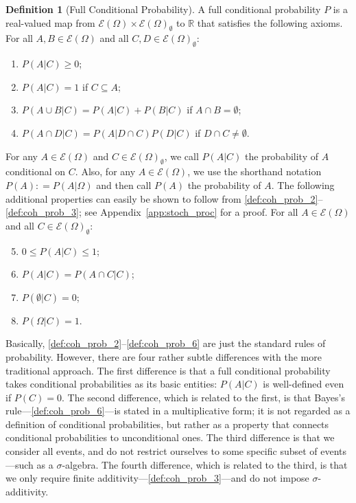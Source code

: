\documentclass[10pt,a4paper]{paper}
\theoremstyle{definition}
\newtheorem{definition}{Definition}
\newcommand{\reals}{\mathbb{R}}
\newcommand{\paths}{\Omega}
\newcommand{\power}{\mathcal{E}(\paths)}
\newcommand{\nonemptypower}{\power_{\emptyset}}
\newcommand{\coloneqq}{:\!=}
\begin{document}
\begin{definition}[Full Conditional Probability]\label{def:cond_prob}
A full conditional probability $P$ is a real-valued map from $\power\times\nonemptypower$ to $\reals$ that satisfies the following axioms. For all $A,B\in\power$ and all \mbox{$C,D\in\nonemptypower$}:
\vspace{5pt}

\begin{enumerate}[label=F\arabic*:,ref=F\arabic*]
\item
$P(A\vert C)\geq 0$;\label{def:coh_prob_2}
\item
$P(A\vert C)=1$ if $C\subseteq A$;\label{def:coh_prob_1}
\item
$P(A\cup B\vert C)=P(A\vert C)+P(B\vert C)$ if $A\cap B=\emptyset$;\label{def:coh_prob_3}
\item
$P(A\cap D\vert C)=P(A\vert D\cap C)P(D\vert C)$ if $D\cap C\neq\emptyset$.\label{def:coh_prob_6}
\end{enumerate}
\vspace{5pt}

\noindent
For any $A\in\power$ and $C\in\nonemptypower$, we call $P(A\vert C)$ the probability of $A$ conditional on $C$. Also, for any $A\in\power$, we use the shorthand notation $P(A)\coloneqq P(A\vert\paths)$ and then call $P(A)$ the probability of $A$.
The following additional properties can easily be shown to follow from \ref{def:coh_prob_2}--\ref{def:coh_prob_3}; see Appendix~\ref{app:stoch_proc} for a proof. For all $A\in\power$ and all $C\in\nonemptypower$:
\vspace{5pt}
\begin{enumerate}[label=F\arabic*:,ref=F\arabic*]
\setcounter{enumi}{4}
\item
$0\leq P(A\vert C)\leq 1$;\label{def:coh_prob_2b}
\item
$P(A\vert C)=P(A\cap C\vert C)$;\label{def:coh_prob_7}
\item
$P(\emptyset\vert C)=0$;\label{def:coh_prob_8}
\item
$P(\Omega\vert C)=1$.\label{def:coh_prob_5}
\end{enumerate}
\vspace{2pt}
\end{definition}

Basically, \ref{def:coh_prob_2}--\ref{def:coh_prob_6} are just the standard rules of probability. However, there are four rather subtle differences with the more traditional approach. The first difference is that a full conditional probability takes conditional probabilities as its basic entities: $P(A\vert C)$ is well-defined even if $P(C)=0$. The second difference, which is related to the first, is that Bayes's rule---\ref{def:coh_prob_6}---is stated in a multiplicative form; it is not regarded as a definition of conditional probabilities, but rather as a property that connects conditional probabilities to unconditional ones. The third difference is that we consider all events, and do not restrict ourselves to some specific subset of events---such as a $\sigma$-algebra. The fourth difference, which is related to the third, is that we only require finite additivity---\ref{def:coh_prob_3}---and do not impose $\sigma$-additivity.
\end{document}
